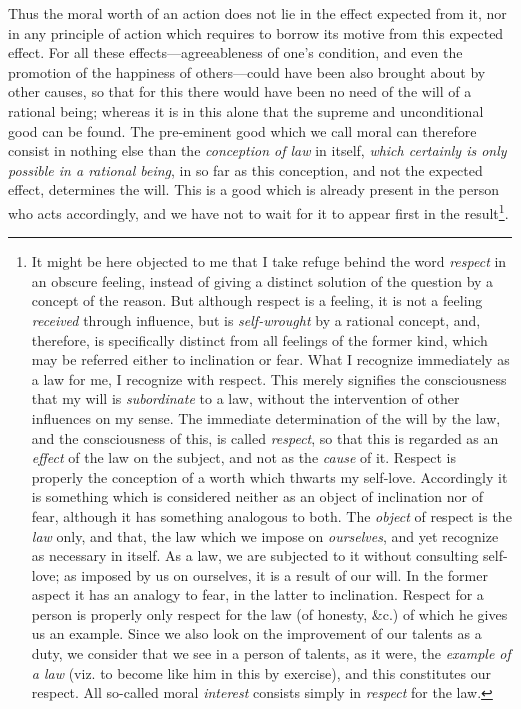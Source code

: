 Thus the moral worth of an action does not lie in the effect expected
from it, nor in any principle of action which requires to borrow its
motive from this expected effect. For all these
effects---agreeableness of one's condition, and even the promotion of
the happiness of others---could have been also brought about by other
causes, so that for this there would have been no need of the will of
a rational being; whereas it is in this alone that the supreme and
unconditional good can be found. The pre-eminent good which we call
moral can therefore consist in nothing else than the
\textit{conception of law} in itself, \textit{which certainly is only
possible in a rational being}, in so far as this conception, and not
the expected effect, determines the will. This is a good which is
already present in the person who acts accordingly, and we have not to
wait for it to appear first in the result\footnote{It might be here
objected to me that I take refuge behind the word \textit{respect} in
an obscure feeling, instead of giving a distinct solution of the
question by a concept of the reason. But although respect is a
feeling, it is not a feeling \textit{received} through influence, but
is \textit{self-wrought} by a rational concept, and, therefore, is
specifically distinct from all feelings of the former kind, which may
be referred either to inclination or fear. What I recognize
immediately as a law for me, I recognize with respect. This merely
signifies the consciousness that my will is \textit{subordinate} to a
law, without the intervention of other influences on my sense. The
immediate determination of the will by the law, and the consciousness
of this, is called \textit{respect}, so that this is regarded as an
\textit{effect} of the law on the subject, and not as the
\textit{cause} of it. Respect is properly the conception of a worth
which thwarts my self-love. Accordingly it is something which is
considered neither as an object of inclination nor of fear, although
it has something analogous to both. The \textit{object} of respect is
the \textit{law} only, and that, the law which we impose on
\textit{ourselves}, and yet recognize as necessary in itself. As a
law, we are subjected to it without consulting self-love; as imposed
by us on ourselves, it is a result of our will. In the former aspect
it has an analogy to fear, in the latter to inclination. Respect for a
person is properly only respect for the law (of honesty, \&c.) of
which he gives us an example. Since we also look on the improvement of
our talents as a duty, we consider that we see in a person of talents,
as it were, the \textit{example of a law} (viz. to become like him in
this by exercise), and this constitutes our respect. All so-called
moral \textit{interest} consists simply in \textit{respect} for the
law.}.

